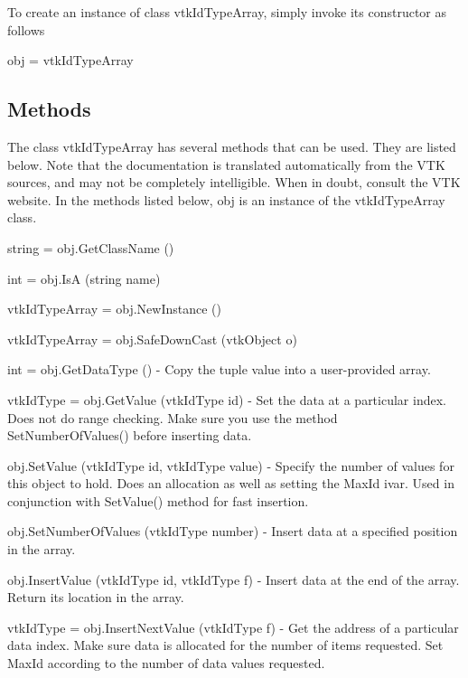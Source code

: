 To create an instance of class vtk\-Id\-Type\-Array, simply invoke its constructor as follows \begin{DoxyVerb}  obj = vtkIdTypeArray
\end{DoxyVerb}
 \hypertarget{vtkwidgets_vtkxyplotwidget_Methods}{}\subsection{Methods}\label{vtkwidgets_vtkxyplotwidget_Methods}
The class vtk\-Id\-Type\-Array has several methods that can be used. They are listed below. Note that the documentation is translated automatically from the V\-T\-K sources, and may not be completely intelligible. When in doubt, consult the V\-T\-K website. In the methods listed below, {\ttfamily obj} is an instance of the vtk\-Id\-Type\-Array class. 
\begin{DoxyItemize}
\item {\ttfamily string = obj.\-Get\-Class\-Name ()}  
\item {\ttfamily int = obj.\-Is\-A (string name)}  
\item {\ttfamily vtk\-Id\-Type\-Array = obj.\-New\-Instance ()}  
\item {\ttfamily vtk\-Id\-Type\-Array = obj.\-Safe\-Down\-Cast (vtk\-Object o)}  
\item {\ttfamily int = obj.\-Get\-Data\-Type ()} -\/ Copy the tuple value into a user-\/provided array.  
\item {\ttfamily vtk\-Id\-Type = obj.\-Get\-Value (vtk\-Id\-Type id)} -\/ Set the data at a particular index. Does not do range checking. Make sure you use the method Set\-Number\-Of\-Values() before inserting data.  
\item {\ttfamily obj.\-Set\-Value (vtk\-Id\-Type id, vtk\-Id\-Type value)} -\/ Specify the number of values for this object to hold. Does an allocation as well as setting the Max\-Id ivar. Used in conjunction with Set\-Value() method for fast insertion.  
\item {\ttfamily obj.\-Set\-Number\-Of\-Values (vtk\-Id\-Type number)} -\/ Insert data at a specified position in the array.  
\item {\ttfamily obj.\-Insert\-Value (vtk\-Id\-Type id, vtk\-Id\-Type f)} -\/ Insert data at the end of the array. Return its location in the array.  
\item {\ttfamily vtk\-Id\-Type = obj.\-Insert\-Next\-Value (vtk\-Id\-Type f)} -\/ Get the address of a particular data index. Make sure data is allocated for the number of items requested. Set Max\-Id according to the number of data values requested.  

\end{DoxyItemize}
